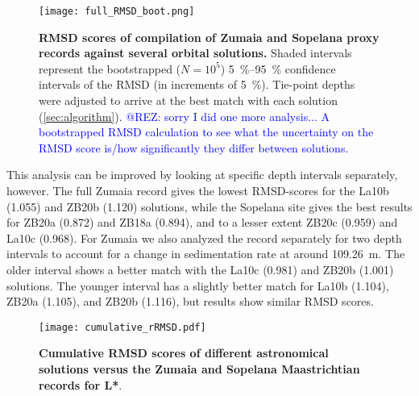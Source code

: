 \documentclass[draft]{agujournal2019}
\newcommand{\ijk}{\textcolor{blue}}
\begin{document}
\setcounter{figure}{2001}
\begin{figure}[htb]
    \centering
    \texttt{[image: full\_RMSD\_boot.png]}
    \caption{\label{fig:full-RMSD-boot}
        \textbf{\gls{RMSD} scores of compilation of Zumaia and Sopelana proxy records against several orbital solutions.}
        Shaded intervals represent the bootstrapped (\(N = 10^{5}\)) \qtyrange{5}{95}{\percent} confidence intervals of the \gls{RMSD} (in increments of \qty{5}{\percent}).
        Tie-point depths were adjusted to arrive at the best match with each solution (\cref{sec:algorithm}).
        \ijk{@REZ: sorry I did one more analysis... A bootstrapped RMSD calculation to see what the uncertainty on the RMSD score is/how significantly they differ between solutions.}
    }
\end{figure}

This analysis can be improved by looking at specific depth intervals separately, however.
The full Zumaia record gives the lowest \gls{RMSD}-scores for the La10b (\num{1.055}) and ZB20b (\num{1.120}) solutions,
while the Sopelana site gives the best results for ZB20a (\num{0.872}) and ZB18a (\num{0.894}), and to a lesser extent ZB20c (\num{0.959}) and La10c (\num{0.968}).
For Zumaia we also analyzed the record separately for two depth intervals to account for a change in sedimentation rate at around \qty{109.26}{\metre}.
The older interval shows a better match with the La10c (\num{0.981}) and ZB20b (1.001) solutions.
The younger interval has a slightly better match for La10b (\num{1.104}), ZB20a (\num{1.105}), and ZB20b (\num{1.116}), but results show similar \gls{RMSD} scores.


\setcounter{figure}{3000}
\begin{figure}[htb]
  \centering
  \texttt{[image: cumulative\_rRMSD.pdf]}
  \caption{\label{fig:cum-RMSD}
    \textbf{Cumulative \gls{RMSD} scores of different astronomical solutions versus the Zumaia and Sopelana Maastrichtian records for \gls{L*}}.
}
\end{figure}
\end{document}
